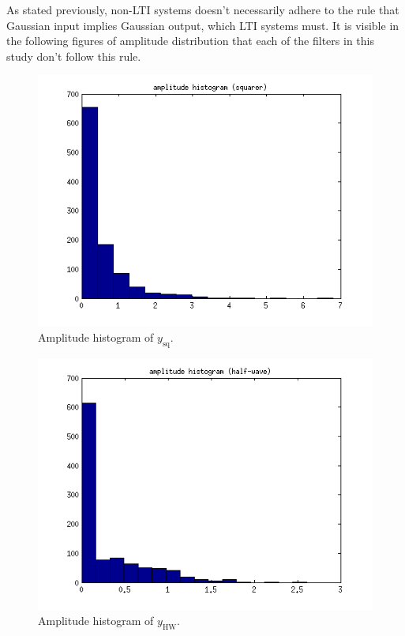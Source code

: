 \documentclass[10pt]{article}
\begin{document}
\newpage
As stated previously, non-LTI systems doesn't necessarily adhere to the rule that Gaussian input implies Gaussian output, which LTI systems must. It is visible in the following figures of amplitude distribution that each of the filters in this study don't follow this rule.

\begin{figure}[!hp]
    \begin{center}
      \includegraphics[width=1\textwidth]{amplitude_histogram_squarer}
    \caption{Amplitude histogram of $y_\text{sq}$. \label{fig:TheoACFsimple}}
    \end{center}
\end{figure}


\begin{figure}[!hp]
    \begin{center}
      \includegraphics[width=1\textwidth]{amplitude_histogram_half-wave}
    \caption{Amplitude histogram of $y_\text{HW}$. \label{fig:TheoACFsimple}}
    \end{center}
\end{figure}
\end{document}
